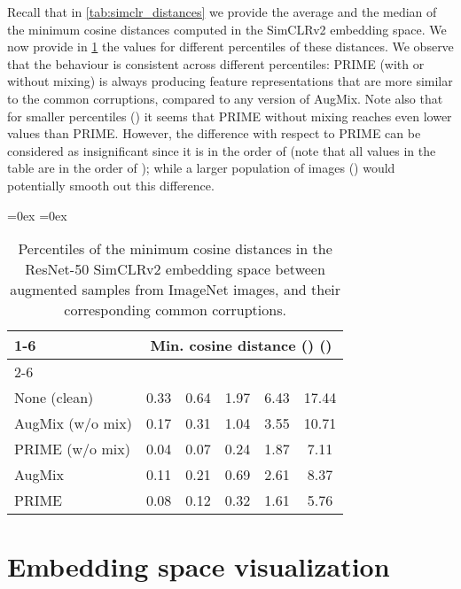 \documentclass[runningheads]{llncs}
\newcommand*{\MyToprule}{\cmidrule[\heavyrulewidth]}
\newcommand*{\MyMidrule}{\cmidrule }
\begin{document}
Recall that in \cref{tab:simclr_distances} we provide the average and the median of the minimum cosine distances computed in the SimCLRv2 embedding space. We now provide in \cref{tab:simclr_percentiles} the values for different percentiles of these distances. We observe that the behaviour is consistent across different percentiles: PRIME (with or without mixing) is always producing feature representations that are more similar to the common corruptions, compared to any version of AugMix. Note also that for smaller percentiles () it seems that PRIME without mixing reaches even lower values than PRIME. However, the difference with respect to PRIME can be considered as insignificant since it is in the order of  (note that all values in the table are in the order of ); while a larger population of images () would potentially smooth out this difference.

\begin{table}[tb]
    \centering
    \footnotesize
    \caption{Percentiles of the minimum cosine distances in the ResNet-50 SimCLRv2 embedding space between  augmented samples from  ImageNet images, and their corresponding common corruptions.}
    \aboverulesep=0ex
    \belowrulesep=0ex
    \begin{tabular}{lccccc}
        \MyToprule{1-6}
        \rule{0pt}{1.1EM}
        \multirow{2}{*}{Method} & \multicolumn{5}{c}{Min. cosine distance \footnotesize{()} ()} \\
        \MyMidrule{2-6}
        &  &  &  &  &  \\
        \midrule
        None (clean) & 0.33 & 0.64 & 1.97 & 6.43 & 17.44 \\
        \midrule
        AugMix (w/o mix) & 0.17 & 0.31 & 1.04 & 3.55 & 10.71 \\
        PRIME (w/o mix) & 0.04 & 0.07 & 0.24 & 1.87 & \multicolumn{1}{c}{7.11} \\
        \midrule
        AugMix & 0.11 & 0.21 & 0.69 & 2.61 & \multicolumn{1}{c}{8.37}\\
        PRIME & 0.08 & 0.12 & 0.32 & 1.61 & \multicolumn{1}{c}{5.76} \\
        \bottomrule
    \end{tabular}
\vspace{-0.8em}
\label{tab:simclr_percentiles}
\end{table}

\section{Embedding space visualization}
\label{app:embedding-visual}
\end{document}
